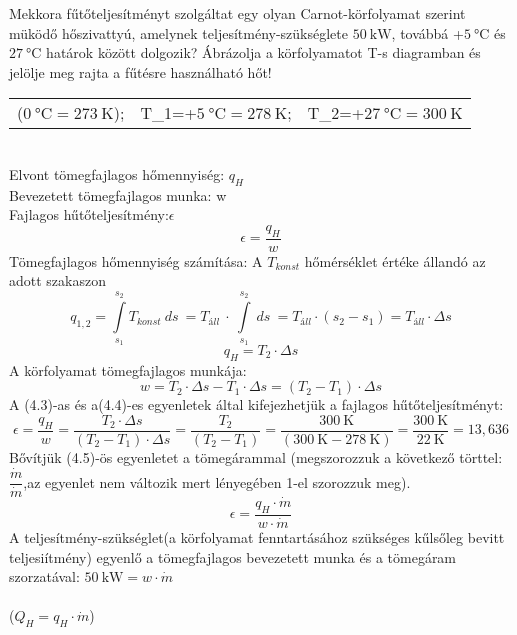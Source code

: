 \noindent Mekkora fűtőteljesítményt szolgáltat egy olyan Carnot-körfolyamat szerint müködő hőszivattyú, amelynek teljesítmény-szükséglete $\SI{50}{\kilo\watt}$, továbbá +$\SI{5}{\celsius}$ és $\SI{27}{\celsius}$ határok között dolgozik?
Ábrázolja a körfolyamatot T-s diagramban és jelölje meg rajta a fűtésre használható hőt!\\
\begin{tabular}{ l l l }
	($\SI{0}{\celsius}=\SI{273}{\kelvin}$); &
	T_1=+$\SI{5}{\celsius}=\SI{278}{\kelvin}$; &  T_2=+$\SI{27}{\celsius}=\SI{300}{\kelvin}$
\end{tabular} 
\\
\noident
Elvont tömegfajlagos hőmennyiség: $q_H$
\\
Bevezetett tömegfajlagos munka: w
\\
Fajlagos hűtőteljesítmény:$\epsilon$
\begin{equation}
\epsilon=\dfrac{q_H}{w}
\end{equation}
\noident Tömegfajlagos hőmennyiség számítása:
A $T_{konst}$ hőmérséklet értéke állandó az adott szakaszon
\begin{equation}
q_{1,2}= \int\limits_{s_1}^{s_2} T_{konst} \ ds \ = T_{áll} \ 
\cdot \ \int\limits_{s_1}^{s_2}  \ ds \ =T_{áll} \cdot (s_2-s_1) = T_{áll} \cdot \Delta s 
\end{equation}
\begin{equation}
q_H=T_2\cdot \Delta s
\end{equation}
\noident A körfolyamat tömegfajlagos munkája:
\begin{equation}
w=T_2\cdot\Delta s - T_1\cdot\Delta s=(T_2-T_1) \cdot\Delta s
\end{equation}
A (4.3)-as és a(4.4)-es egyenletek által kifejezhetjük a fajlagos hűtőteljesítményt:
\\
\begin{equation}
\epsilon=\dfrac{q_H}{w}=\dfrac{T_2 \cdot \Delta s}{ (T_2-T_1) \cdot\Delta s }=\dfrac{T_2}{ (T_2-T_1)}=\dfrac{\SI{300}{\kelvin}}{ (\SI{300}{\kelvin}-\SI{278}{\kelvin})}=\dfrac{\SI{300}{\kelvin}}{ \SI{22}{\kelvin}}=13,636
\end{equation}
\noisdent Bővítjük (4.5)-ös egyenletet a tömegárammal (megszorozzuk a következő törttel: $\dfrac{ \dot{m}}{\dot{m}}$,az egyenlet nem változik mert lényegében 1-el szorozzuk meg).
\begin{equation}
\epsilon=\dfrac{q_H \cdot \dot{m}}{w\cdot \dot{m}}
\end{equation}
\noident A teljesítmény-szükséglet(a körfolyamat fenntartásához szükséges kűlsőleg bevitt teljesiítmény) egyenlő a tömegfajlagos bevezetett munka és a tömegáram szorzatával: $\SI{50}{\kilo\watt}=w\cdot \dot{m}$\\
\\
($Q_H=q_H\cdot \dot{m}$)

